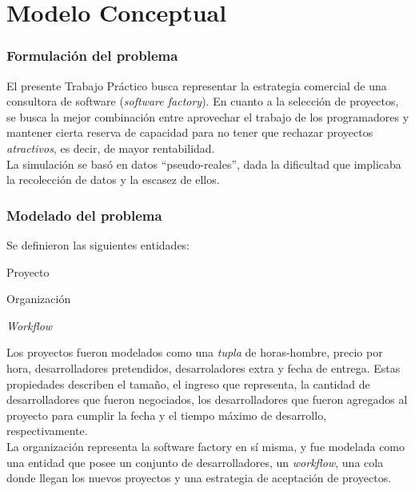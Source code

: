 \part*{Modelo Conceptual}

\section{Formulación del problema}

El presente Trabajo Práctico busca representar la estrategia comercial de una consultora de software (\textit{software factory}). En cuanto a la selección de proyectos, se busca 
la mejor combinación entre aprovechar el trabajo de los programadores y mantener cierta reserva de capacidad para no tener que rechazar proyectos \textit{atractivos}, es decir,
de mayor rentabilidad.\\

La simulación se basó en datos ``pseudo-reales'', dada la dificultad que implicaba la recolección de datos y la escasez de ellos.\\

\section{Modelado del problema}

Se definieron las siguientes entidades:

\begin{itemize*}
    \item Proyecto
    \item Organización
    \item \textit{Workflow}
\end{itemize*}

Los proyectos fueron modelados como una \textit{tupla} de horas-hombre, precio por hora, desarrolladores pretendidos, desarroladores extra y fecha de entrega. Estas propiedades describen el tamaño, el ingreso que representa, la cantidad de desarrolladores que fueron negociados, los desarrolladores que fueron agregados al proyecto para cumplir la fecha y el
tiempo máximo de desarrollo, respectivamente.\\

La organización representa la software factory en sí misma, y fue modelada como una entidad que posee un conjunto de desarrolladores, un \textit{workflow}, una cola donde 
llegan los nuevos proyectos y una estrategia de aceptación de proyectos.\\

